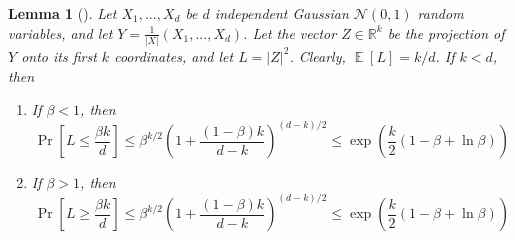 \documentclass{article}
\newtheorem{lemma}{Lemma}
\theoremstyle{definition}
\DeclareMathOperator*{\Eop}{\mathbb{E}}
\newcommand{\E}[1]{\ensuremath{\Eop\left[{#1}\right]}}
\DeclareMathOperator*{\probop}{Pr}
\newcommand{\prob}[1]{\ensuremath{\probop\left[{#1}\right]}}
\newcommand{\normal}[2]{\ensuremath{\mathcal{N}\left({{#1}},{{#2}}\right)}}
\begin{document}
\begin{lemma}[\cite{dasgupta2003elementary}]
\label{lemma:dasgupta}
Let $X_1,...,X_d$ be $d$ independent Gaussian \normal{0}{1} random variables,
and let $Y=\frac{1}{|X|}(X_1,...,X_d)$.
Let the vector $Z\in\mathbb{R}^k$ be the projection of $Y$ onto its first $k$ coordinates,
and let $L=|Z|^2$.
Clearly, $\E{L}=k/d$.
If $k<d$, then
\begin{enumerate}
\item If $\beta < 1$, then
\begin{equation}
\prob{L \le \frac{\beta k}{d}}
\le
\beta^{k/2}\left(1+\frac{(1-\beta)k}{d-k}\right)^{(d-k)/2}
\le
\exp \left( \frac{k}{2} (1-\beta+\ln \beta) \right)
\end{equation}
\item If $\beta > 1$, then
\begin{equation}
\prob{L \ge \frac{\beta k}{d}}
\le
\beta^{k/2}\left(1+\frac{(1-\beta)k}{d-k}\right)^{(d-k)/2}
\le
\exp \left( \frac{k}{2} (1-\beta+\ln \beta) \right)
\end{equation}
\end{enumerate}
\end{lemma}
\end{document}
